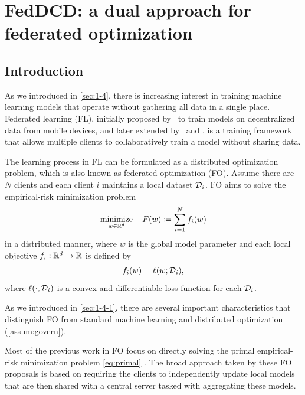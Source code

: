 \chapter{FedDCD: a dual approach for federated optimization}
\label{ch:Dual-Fed-Opt}

\section{Introduction} \label{sec:6-1}

As we introduced in \autoref{sec:1-4}, there is increasing interest in training machine learning models that operate without gathering all data in a single place. Federated learning (FL), initially proposed by~\citet{mcmahan2017communication} to train models on decentralized data from mobile devices, and later extended by~\citet{yang2019federated} and \citet{kairouz2019advances}, is a training framework that allows multiple clients to collaboratively train a model without sharing data. 

The learning process in FL can be formulated as a distributed optimization problem, which is also known as federated optimization (FO). Assume there are $N$ clients and each client $i$ maintains a local dataset $\mathcal{D}_i$. FO aims to solve the  empirical-risk minimization problem
\begin{equation} \label{eq:primal}
  \displaystyle\mathop{\hbox{\rm minimize}}_{w\in\mathbb{R}^d}\enspace\enspace F(w) \coloneqq \sum_{i = 1}^N f_i(w) 
\end{equation}
in a distributed manner, where $w$ is the global model parameter and each local objective $f_i:\mathbb{R}^d \to\mathbb{R}$ is defined by 
\begin{equation*} %
    f_i(w) = \ell(w; \Dscr_i),
\end{equation*}
where $\ell(\cdot, \mathcal{D}_i)$ is a convex and differentiable loss function for each $\mathcal{D}_i$. 

As we introduced in \autoref{sec:1-4-1}, there are several important characteristics that distinguish FO from standard machine learning and distributed optimization (\autoref{assum:govern}). 

Most of the previous work in FO focus on directly solving the primal empirical-risk minimization problem \eqref{eq:primal}
\citep{mcmahan2017communication,li2018federated,yuan2021federated,karimireddy2020mime}. The broad approach taken by these FO proposals is based on requiring the clients to independently update local models that are then shared with a central server tasked with aggregating these models. 


